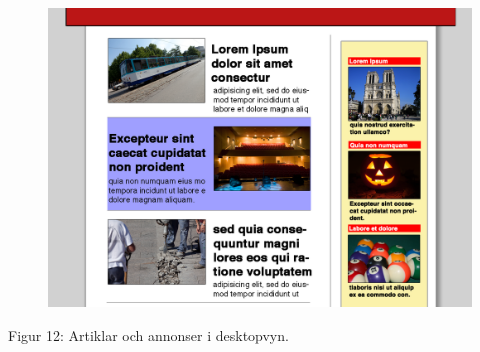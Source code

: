 \documentclass[11pt]{article}
\begin{document}
\begin{figure}[H]
\centerline{%
\includegraphics[scale=0.3]{pics/artikelannonsdesktop.png}
}
\end{figure}
\hspace{0.5cm}Figur 12: Artiklar och annonser i desktopvyn.
\\
\end{document}
